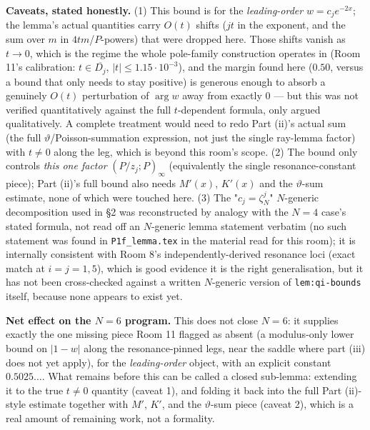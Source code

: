 \documentclass[11pt]{article}
\begin{document}
\textbf{Caveats, stated honestly.} (1) This bound is for the \emph{leading-order} $w=c_je^{-2x}$;
the lemma's actual quantities carry $O(t)$ shifts ($jt$ in the exponent, and the sum over $m$ in
$4tm$/$P$-powers) that were dropped here. Those shifts vanish as $t\to0$, which is the regime the
whole pole-family construction operates in (Room 11's calibration: $t\in\overline{D_j}$,
$|t|\le1.15\cdot10^{-3}$), and the margin found here ($0.50$, versus a bound that only needs to stay
positive) is generous enough to absorb a genuinely $O(t)$ perturbation of $\arg w$ away from exactly
$0$ --- but this was not verified quantitatively against the full $t$-dependent formula, only
argued qualitatively. A complete treatment would need to redo Part (ii)'s actual sum (the full
$\vartheta$/Poisson-summation expression, not just the single ray-lemma factor) with $t\ne0$ along
the leg, which is beyond this room's scope. (2) The bound only controls \emph{this one factor}
$(P/z_j;P)_\infty$ (equivalently the single resonance-constant piece); Part (ii)'s full bound also
needs $M'(x)$, $K'(x)$ and the $\vartheta$-sum estimate, none of which were touched here. (3) The
"$c_j=\zeta_N^j$" $N$-generic decomposition used in \S2 was reconstructed by analogy with the
$N=4$ case's stated formula, not read off an $N$-generic lemma statement verbatim (no such
statement was found in \texttt{P1f\_lemma.tex} in the material read for this room); it is internally
consistent with Room 8's independently-derived resonance loci (exact match at $i=j=1,5$), which is
good evidence it is the right generalisation, but it has not been cross-checked against a written
$N$-generic version of \texttt{lem:qi-bounds} itself, because none appears to exist yet.

\textbf{Net effect on the $N=6$ program.} This does not close $N=6$: it supplies exactly the one
missing piece Room 11 flagged as absent (a modulus-only lower bound on $|1-w|$ along the
resonance-pinned legs, near the saddle where part (iii) does not yet apply), for the
\emph{leading-order} object, with an explicit constant $0.5025\ldots$. What remains before this can
be called a closed sub-lemma: extending it to the true $t\ne0$ quantity (caveat 1), and folding it
back into the full Part (ii)-style estimate together with $M'$, $K'$, and the $\vartheta$-sum
piece (caveat 2), which is a real amount of remaining work, not a formality.
\end{document}

